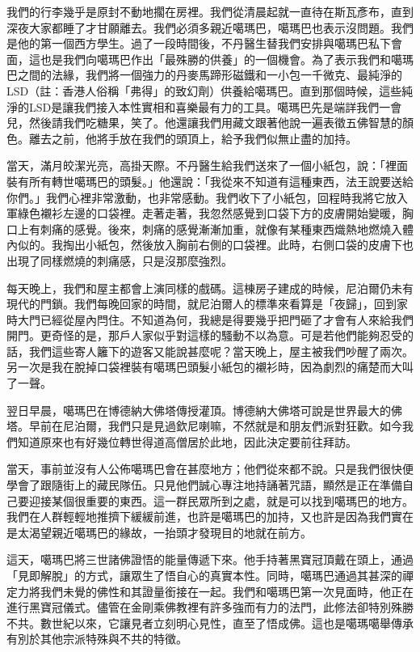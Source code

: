 我們的行李幾乎是原封不動地擱在房裡。我們從清晨起就一直待在斯瓦彥布，直到深夜大家都睡了才甘願離去。我們必須多親近噶瑪巴，噶瑪巴也表示沒問題。我們是他的第一個西方學生。過了一段時間後，不丹醫生替我們安排與噶瑪巴私下會面，這也是我們向噶瑪巴作出「最殊勝的供養」的一個機會。為了表示我們和噶瑪巴之間的法緣，我們將一個強力的丹麥馬蹄形磁鐵和一小包一千微克、最純淨的LSD（註：香港人俗稱「弗得」的致幻劑）供養給噶瑪巴。直到那個時候，這些純淨的LSD是讓我們接入本性實相和喜樂最有力的工具。噶瑪巴先是端詳我們一會兒，然後請我們吃糖果，笑了。他還讓我們用藏文跟著他說一遍表徵五佛智慧的顏色。離去之前，他將手放在我們的頭頂上，給予我們似無止盡的加持。

當天，滿月皎潔光亮，高掛天際。不丹醫生給我們送來了一個小紙包，說：「裡面裝有所有轉世噶瑪巴的頭髮。」他還說：「我從來不知道有這種東西，法王說要送給你們。」我們心裡非常激動，也非常感動。我們收下了小紙包，回程時我將它放入軍綠色襯衫左邊的口袋裡。走著走著，我忽然感覺到口袋下方的皮膚開始變暖，胸口上有刺痛的感覺。後來，刺痛的感覺漸漸加重，就像有某種東西熾熱地燃燒入體內似的。我掏出小紙包，然後放入胸前右側的口袋裡。此時，右側口袋的皮膚下也出現了同樣燃燒的刺痛感，只是沒那麼強烈。

每天晚上，我們和屋主都會上演同樣的戲碼。這棟房子建成的時候，尼泊爾仍未有現代的門鎖。我們每晚回家的時間，就尼泊爾人的標準來看算是「夜歸」，回到家時大門已經從屋內閂住。不知道為何，我總是得要幾乎把門砸了才會有人來給我們開門。更奇怪的是，那戶人家似乎對這樣的騷動不以為意。可是若他們能夠忍受的話，我們這些寄人籬下的遊客又能說甚麼呢？當天晚上，屋主被我們吵醒了兩次。另一次是我在脫掉口袋裡裝有噶瑪巴頭髮小紙包的襯衫時，因為劇烈的痛楚而大叫了一聲。

翌日早晨，噶瑪巴在博德納大佛塔傳授灌頂。博德納大佛塔可說是世界最大的佛塔。早前在尼泊爾，我們只是見過欽尼喇嘛，不然就是和朋友們派對狂歡。如今我們知道原來也有好幾位轉世得道高僧居於此地，因此決定要前往拜訪。

當天，事前並沒有人公佈噶瑪巴會在甚麼地方；他們從來都不說。只是我們很快便學會了跟隨街上的藏民隊伍。只見他們誠心專注地持誦著咒語，顯然是正在準備自己要迎接某個很重要的東西。這一群民眾所到之處，就是可以找到噶瑪巴的地方。我們在人群輕輕地推擠下緩緩前進，也許是噶瑪巴的加持，又也許是因為我們實在是太渴望親近噶瑪巴的緣故，一抬頭才發現目的地就在前方。

這天，噶瑪巴將三世諸佛證悟的能量傳遞下來。他手持著黑寶冠頂戴在頭上，通過「見即解脫」的方式，讓眾生了悟自心的真實本性。同時，噶瑪巴通過其甚深的禪定力將我們未覺的佛性和其證量銜接在一起。我們和噶瑪巴第一次見面時，他正在進行黑寶冠儀式。儘管在金剛乘佛教裡有許多強而有力的法門，此修法卻特別殊勝不共。數世紀以來，它讓見者立刻明心見性，直至了悟成佛。這也是噶瑪噶舉傳承有別於其他宗派特殊與不共的特徵。

